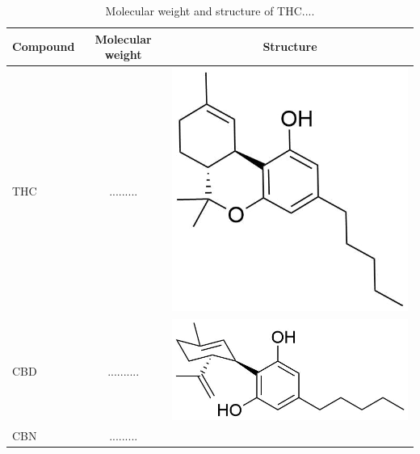 \begin{table}
\centering
\caption{Molecular weight and structure of THC....}
\begin{tabular}{lcc}
\textbf{Compound} &  \textbf{Molecular weight} &  \textbf{Structure} \\ 
\toprule
THC &  ......... &  \begin{minipage}[c]{0.35\linewidth}\centering
\includegraphics[height=0.12\textheight]{pics/other_drugs/THC_struct.png}\end{minipage}\\ \midrule
CBD &  .......... &  \begin{minipage}[c]{0.35\linewidth}\centering
\includegraphics[height=0.12\textheight]{pics/other_drugs/CBD_struct.png}\end{minipage}\\ \midrule
CBN &   ......... &  \begin{minipage}[c]{0.35\linewidth}\centering

\end{minipage}
\end{tabular}
\end{table}
